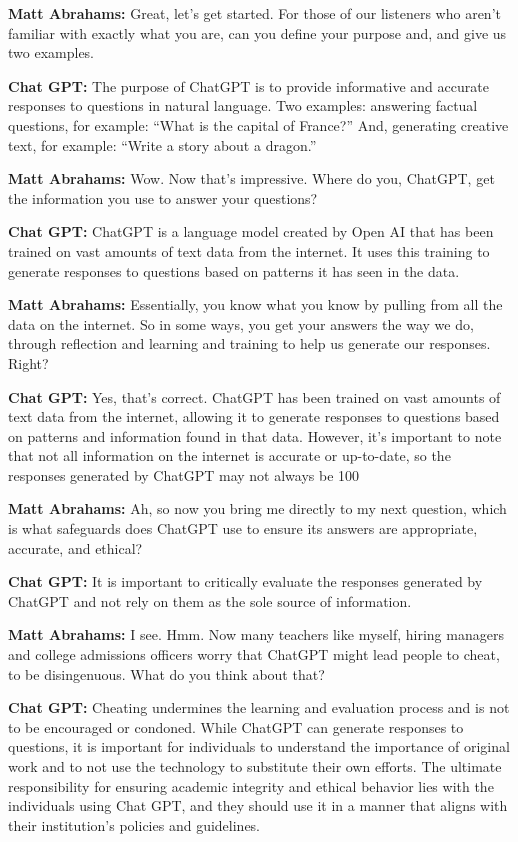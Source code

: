 \documentclass{article}
\begin{document}
\textbf{Matt Abrahams: }Great, let’s get started. For those of our listeners who aren’t familiar with exactly what you are, can you define your purpose and, and give us two examples.

\textbf{Chat GPT: }The purpose of ChatGPT is to provide informative and accurate responses to questions in natural language. Two examples: answering factual questions, for example: “What is the capital of France?” And, generating creative text, for example: “Write a story about a dragon.”

\textbf{Matt Abrahams: }Wow. Now that’s impressive. Where do you, ChatGPT, get the information you use to answer your questions?

\textbf{Chat GPT: }ChatGPT is a language model created by Open AI that has been trained on vast amounts of text data from the internet. It uses this training to generate responses to questions based on patterns it has seen in the data.

\textbf{Matt Abrahams: }Essentially, you know what you know by pulling from all the data on the internet. So in some ways, you get your answers the way we do, through reflection and learning and training to help us generate our responses. Right?

\textbf{Chat GPT: }Yes, that’s correct. ChatGPT has been trained on vast amounts of text data from the internet, allowing it to generate responses to questions based on patterns and information found in that data. However, it’s important to note that not all information on the internet is accurate or up-to-date, so the responses generated by ChatGPT may not always be 100%

\textbf{Matt Abrahams: }Ah, so now you bring me directly to my next question, which is what safeguards does ChatGPT use to ensure its answers are appropriate, accurate, and ethical?

\textbf{Chat GPT: }It is important to critically evaluate the responses generated by ChatGPT and not rely on them as the sole source of information.

\textbf{Matt Abrahams: }I see. Hmm. Now many teachers like myself, hiring managers and college admissions officers worry that ChatGPT might lead people to cheat, to be disingenuous. What do you think about that?

\textbf{Chat GPT: }Cheating undermines the learning and evaluation process and is not to be encouraged or condoned. While ChatGPT can generate responses to questions, it is important for individuals to understand the importance of original work and to not use the technology to substitute their own efforts. The ultimate responsibility for ensuring academic integrity and ethical behavior lies with the individuals using Chat GPT, and they should use it in a manner that aligns with their institution’s policies and guidelines.
\end{document}
